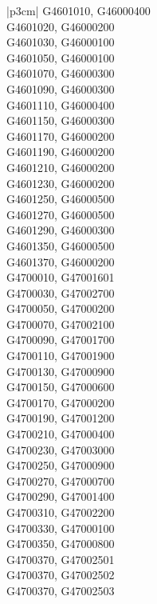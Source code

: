 \begin{customLongTable}{ |p{3cm}| }
G4601010, G46000400 \\ \hline
G4601020, G46000200 \\ \hline
G4601030, G46000100 \\ \hline
G4601050, G46000100 \\ \hline
G4601070, G46000300 \\ \hline
G4601090, G46000300 \\ \hline
G4601110, G46000400 \\ \hline
G4601150, G46000300 \\ \hline
G4601170, G46000200 \\ \hline
G4601190, G46000200 \\ \hline
G4601210, G46000200 \\ \hline
G4601230, G46000200 \\ \hline
G4601250, G46000500 \\ \hline
G4601270, G46000500 \\ \hline
G4601290, G46000300 \\ \hline
G4601350, G46000500 \\ \hline
G4601370, G46000200 \\ \hline
G4700010, G47001601 \\ \hline
G4700030, G47002700 \\ \hline
G4700050, G47000200 \\ \hline
G4700070, G47002100 \\ \hline
G4700090, G47001700 \\ \hline
G4700110, G47001900 \\ \hline
G4700130, G47000900 \\ \hline
G4700150, G47000600 \\ \hline
G4700170, G47000200 \\ \hline
G4700190, G47001200 \\ \hline
G4700210, G47000400 \\ \hline
G4700230, G47003000 \\ \hline
G4700250, G47000900 \\ \hline
G4700270, G47000700 \\ \hline
G4700290, G47001400 \\ \hline
G4700310, G47002200 \\ \hline
G4700330, G47000100 \\ \hline
G4700350, G47000800 \\ \hline
G4700370, G47002501 \\ \hline
G4700370, G47002502 \\ \hline
G4700370, G47002503 \\ \hline

\end{customLongTable}
